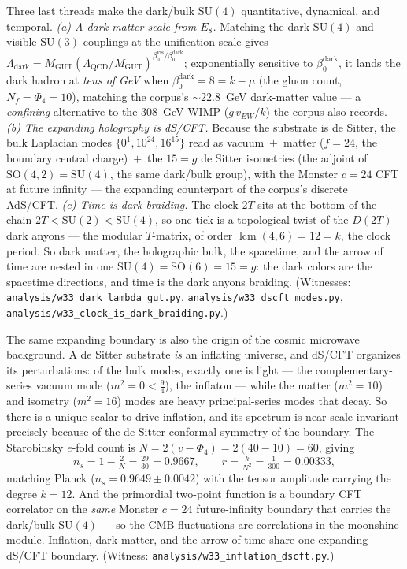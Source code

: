 \documentclass[11pt]{article}
\begin{document}
Three last threads make the dark/bulk $\mathrm{SU}(4)$ quantitative, dynamical, and
temporal. \emph{(a) A dark-matter scale from $E_8$.} Matching the dark
$\mathrm{SU}(4)$ and visible $\mathrm{SU}(3)$ couplings at the unification scale
gives $\Lambda_{\text{dark}}=M_{\mathrm{GUT}}(\Lambda_{\mathrm{QCD}}/M_{\mathrm{GUT}})^{\beta_0^{\text{vis}}/\beta_0^{\text{dark}}}$;
exponentially sensitive to $\beta_0^{\text{dark}}$, it lands the dark hadron at
\emph{tens of GeV} when $\beta_0^{\text{dark}}=8=k-\mu$ (the gluon count,
$N_f=\Phi_4=10$), matching the corpus's $\sim22.8$~GeV dark-matter value --- a
\emph{confining} alternative to the $308$~GeV WIMP ($g\,v_{EW}/k$) the corpus also
records. \emph{(b) The expanding holography is dS/CFT.} Because the substrate is de
Sitter, the bulk Laplacian modes $\{0^1,10^{24},16^{15}\}$ read as
vacuum~$+$~matter ($f=24$, the boundary central charge)~$+$~the $15=g$ de Sitter
isometries (the adjoint of $\mathrm{SO}(4,2)=\mathrm{SU}(4)$, the same dark/bulk
group), with the Monster $c=24$ CFT at future infinity --- the expanding
counterpart of the corpus's discrete AdS/CFT. \emph{(c) Time is dark braiding.}
The clock $2T$ sits at the bottom of the chain $2T<\mathrm{SU}(2)<\mathrm{SU}(4)$,
so one tick is a topological twist of the $D(2T)$ dark anyons --- the modular
$T$-matrix, of order $\operatorname{lcm}(4,6)=12=k$, the clock period. So dark
matter, the holographic bulk, the spacetime, and the arrow of time are nested in
one $\mathrm{SU}(4)=\mathrm{SO}(6)=15=g$: the dark colors are the spacetime
directions, and time is the dark anyons braiding. (Witnesses:
\texttt{analysis/w33\_dark\_lambda\_gut.py},
\texttt{analysis/w33\_dscft\_modes.py},
\texttt{analysis/w33\_clock\_is\_dark\_braiding.py}.)

The same expanding boundary is also the origin of the cosmic microwave background.
A de Sitter substrate \emph{is} an inflating universe, and dS/CFT organizes its
perturbations: of the bulk modes, exactly one is light --- the complementary-series
vacuum mode ($m^2=0<\tfrac94$), the inflaton --- while the matter ($m^2=10$) and
isometry ($m^2=16$) modes are heavy principal-series modes that decay. So there is
a unique scalar to drive inflation, and its spectrum is near-scale-invariant
precisely because of the de Sitter conformal symmetry of the boundary. The
Starobinsky $e$-fold count is $N=2(v-\Phi_4)=2(40-10)=60$, giving
\[
  n_s = 1-\tfrac2N = \tfrac{29}{30}=0.9667,\qquad
  r = \tfrac{k}{N^2} = \tfrac1{300}=0.00333,
\]
matching Planck ($n_s=0.9649\pm0.0042$) with the tensor amplitude carrying the
degree $k=12$. And the primordial two-point function is a boundary CFT correlator
on the \emph{same} Monster $c=24$ future-infinity boundary that carries the
dark/bulk $\mathrm{SU}(4)$ --- so the CMB fluctuations are correlations in the
moonshine module. Inflation, dark matter, and the arrow of time share one
expanding dS/CFT boundary. (Witness:
\texttt{analysis/w33\_inflation\_dscft.py}.)
\end{document}
